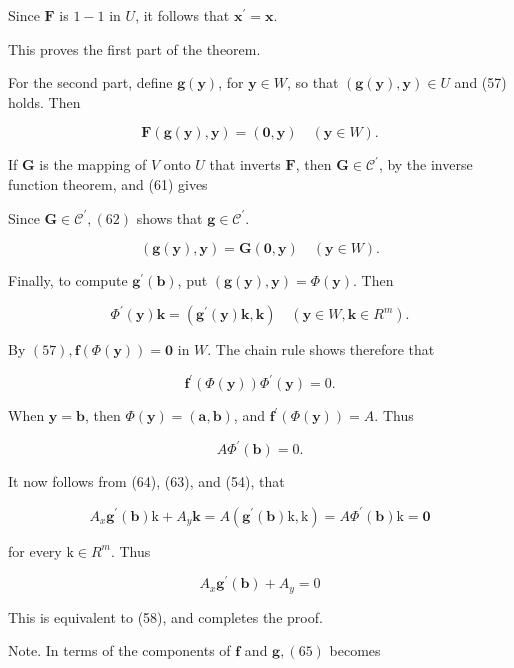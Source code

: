 \documentclass[10pt]{article}
\begin{document}
Since $\mathbf{F}$ is $1-1$ in $U$, it follows that $\mathbf{x}^{\prime}=\mathbf{x}$.

This proves the first part of the theorem.

For the second part, define $\mathbf{g}(\mathbf{y})$, for $\mathbf{y} \in W$, so that $(\mathbf{g}(\mathbf{y}), \mathbf{y}) \in U$ and (57) holds. Then

$$
\mathbf{F}(\mathbf{g}(\mathbf{y}), \mathbf{y})=(\mathbf{0}, \mathbf{y}) \quad(\mathbf{y} \in W) .
$$

If $\mathbf{G}$ is the mapping of $V$ onto $U$ that inverts $\mathbf{F}$, then $\mathbf{G} \in \mathscr{C}^{\prime}$, by the inverse function theorem, and (61) gives

Since $\mathbf{G} \in \mathscr{C}^{\prime},(62)$ shows that $\mathbf{g} \in \mathscr{C}^{\prime}$.

$$
(\mathbf{g}(\mathbf{y}), \mathbf{y})=\mathbf{G}(\mathbf{0}, \mathbf{y}) \quad(\mathbf{y} \in W) .
$$

Finally, to compute $\mathbf{g}^{\prime}(\mathbf{b})$, put $(\mathbf{g}(\mathbf{y}), \mathbf{y})=\Phi(\mathbf{y})$. Then

$$
\Phi^{\prime}(\mathbf{y}) \mathbf{k}=\left(\mathbf{g}^{\prime}(\mathbf{y}) \mathbf{k}, \mathbf{k}\right) \quad\left(\mathbf{y} \in W, \mathbf{k} \in R^{m}\right) .
$$

By $(57), \mathbf{f}(\Phi(\mathbf{y}))=\mathbf{0}$ in $W$. The chain rule shows therefore that

$$
\mathbf{f}^{\prime}(\Phi(\mathbf{y})) \Phi^{\prime}(\mathbf{y})=0 .
$$

When $\mathbf{y}=\mathbf{b}$, then $\Phi(\mathbf{y})=(\mathbf{a}, \mathbf{b})$, and $\mathbf{f}^{\prime}(\Phi(\mathbf{y}))=A$. Thus

$$
A \Phi^{\prime}(\mathbf{b})=0 .
$$

It now follows from (64), (63), and (54), that

$$
A_{x} \mathbf{g}^{\prime}(\mathbf{b}) \mathrm{k}+A_{y} \mathbf{k}=A\left(\mathbf{g}^{\prime}(\mathbf{b}) \mathrm{k}, \mathrm{k}\right)=A \Phi^{\prime}(\mathbf{b}) \mathrm{k}=\mathbf{0}
$$

for every $\mathrm{k} \in R^{m}$. Thus

$$
A_{x} \mathbf{g}^{\prime}(\mathbf{b})+A_{y}=0
$$

This is equivalent to (58), and completes the proof.

Note. In terms of the components of $\mathbf{f}$ and $\mathbf{g},(65)$ becomes
\end{document}

